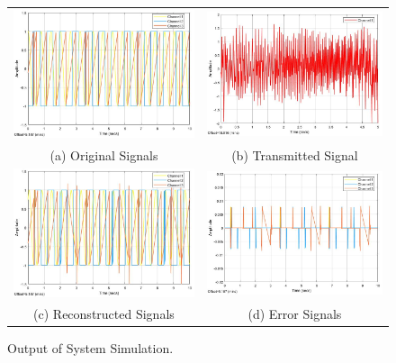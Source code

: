 \begin{figure}[htpb]
\centering
\begin{tabular}{cc}
  \includegraphics[width=80mm]{original_signal.jpg} & \includegraphics[width=80mm]{transmitted_signal.jpg} \\
(a) Original Signals  & (b) Transmitted Signal  \\[8pt]
 \includegraphics[width=80mm]{reconstructed_signal.jpg} & \includegraphics[width=80mm]{error_signal.jpg} \\
(c) Reconstructed Signals  & (d) Error Signals  \\[8pt]
\end{tabular}
\caption{Output of System Simulation.}
\label{sim_output}
\end{figure}

